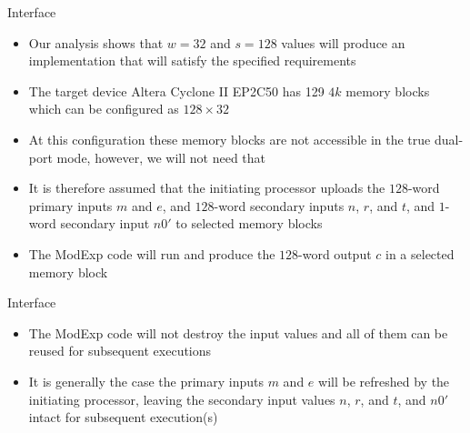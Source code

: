 \documentclass[xcolor=dvipsnames]{beamer}
\begin{document}
\begin{frame}{Interface}
\begin{itemize}

\item Our analysis shows that $w=32$ and $s=128$ values will produce an
implementation that will satisfy the specified requirements

\item The target device Altera Cyclone II EP2C50 has 129 $4k$ memory
blocks which can be configured as $128 \times 32$

\item At this configuration these memory blocks are not accessible 
in the true dual-port mode, however, we will not need that

\item It is therefore assumed that the initiating processor uploads
the $128$-word primary inputs $m$ and $e$, and $128$-word secondary 
inputs $n$, $r$, and $t$, and $1$-word secondary input $n0'$ to 
selected memory blocks

\item The ModExp code will run and produce the $128$-word output $c$
in a selected memory block

\end{itemize}
\end{frame}

\begin{frame}{Interface}
\begin{itemize}

\item The ModExp code will not destroy the input values and all of them can
be reused for subsequent executions

\item It is generally the case the primary inputs $m$ and $e$ will be
refreshed by the initiating processor, leaving the secondary input
values $n$, $r$, and $t$, and $n0'$ intact for subsequent execution(s)

\end{itemize}
\end{frame}
\end{document}
